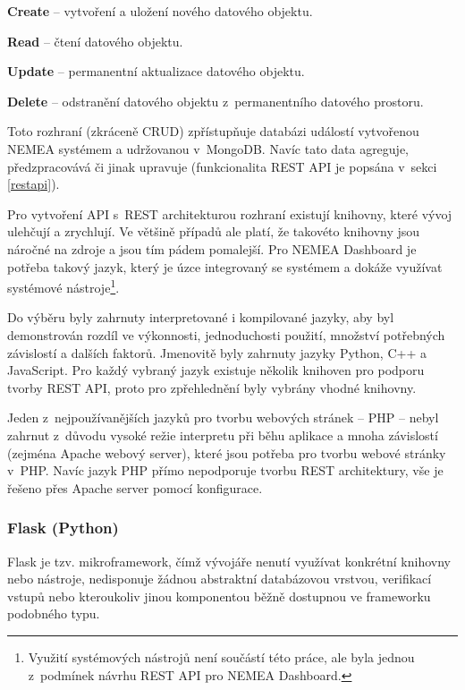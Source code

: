 \begin{description}
    \item {\bf Create} -- vytvoření a uložení nového datového objektu.
    \item {\bf Read} -- čtení datového objektu.
    \item {\bf Update} -- permanentní aktualizace datového objektu.
    \item {\bf Delete} -- odstranění datového objektu z~permanentního datového prostoru.
\end{description}

Toto rozhraní (zkráceně CRUD) zpřístupňuje databázi událostí vytvořenou NEMEA systémem a udržovanou v~MongoDB. Navíc tato data agreguje, předzpracovává či jinak upravuje (funkcionalita REST API je popsána v~sekci \ref{restapi}).

Pro vytvoření API s~REST architekturou rozhraní existují knihovny, které vývoj ulehčují a zrychlují. Ve většině případů ale platí, že takovéto knihovny jsou náročné na zdroje a jsou tím pádem pomalejší. Pro NEMEA Dashboard je potřeba takový jazyk, který je úzce integrovaný se systémem a dokáže využívat systémové nástroje\footnote{Využití systémových nástrojů není součástí této práce, ale byla jednou z~podmínek návrhu REST API pro NEMEA Dashboard.}.

Do výběru byly zahrnuty interpretované i kompilované jazyky, aby byl demonstrován rozdíl ve výkonnosti, jednoduchosti použití, množství potřebných závislostí a dalších faktorů. Jmenovitě byly zahrnuty jazyky Python, C++ a JavaScript. Pro každý vybraný jazyk existuje několik knihoven pro podporu tvorby REST API, proto pro zpřehlednění byly vybrány vhodné knihovny.

Jeden z~nejpoužívanějších jazyků pro tvorbu webových stránek -- PHP -- nebyl zahrnut z~důvodu vysoké režie interpretu při běhu aplikace a mnoha závislostí (zejména Apache webový server), které jsou potřeba pro tvorbu webové stránky v~PHP. Navíc jazyk PHP přímo nepodporuje tvorbu REST architektury, vše je řešeno přes Apache server pomocí konfigurace.

\subsubsection*{Flask (Python)}

Flask je tzv. mikroframework, čímž vývojáře nenutí využívat konkrétní knihovny nebo nástroje, nedisponuje žádnou abstraktní databázovou vrstvou, verifikací vstupů nebo kteroukoliv jinou komponentou běžně dostupnou ve frameworku podobného typu.

